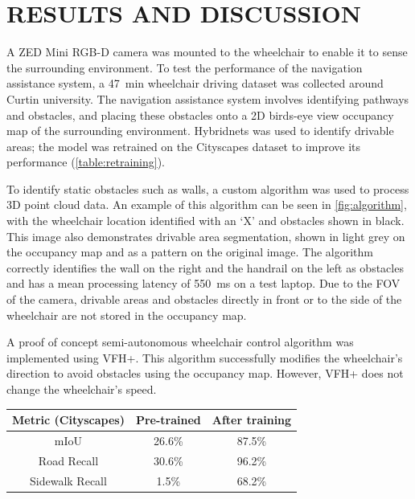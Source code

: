 \documentclass[10pt,twoside]{article}
\begin{document}
\section*{\textbf{RESULTS AND DISCUSSION}} %
A ZED Mini RGB-D camera was mounted to the wheelchair to enable it to
sense the surrounding environment. To test the performance of the navigation
assistance system, a \SI{47}{\minute} wheelchair driving dataset was collected around
Curtin university.
The navigation assistance system involves identifying pathways and obstacles,
and placing these obstacles onto a 2D birds-eye view occupancy map of the
surrounding environment. Hybridnets was used to identify drivable
areas; the model was retrained on the Cityscapes dataset to improve its performance (\cref{table:retraining}).

To identify static obstacles such as walls, a custom algorithm was used to process 3D point cloud data.
An example of this algorithm can be seen in \cref{fig:algorithm},
with the wheelchair location identified with an `X' and obstacles shown in black.
This image also demonstrates drivable area segmentation, shown in light grey on the
occupancy map and as a pattern on the original image.
The algorithm correctly identifies the wall on the right and the handrail on the left as obstacles
and has a mean processing latency of \SI{550}{\milli\second} on a test laptop.
Due to the FOV of the camera, drivable areas and obstacles directly in front or to the side of
the wheelchair are not stored in the occupancy map.

A proof of concept semi-autonomous wheelchair control algorithm was implemented using VFH+.
This algorithm successfully modifies the wheelchair's direction to avoid obstacles using the
occupancy map. However, VFH+ does not change the wheelchair's speed.

\setlength{\abovecaptionskip}{0pt}
\setlength{\belowcaptionskip}{10pt}
\begin{center}
    \label{table:retraining}
    \begin{tabular}{c c c}
    \toprule
    Metric (Cityscapes) & Pre-trained & After training \\
    \midrule
    mIoU & 26.6\% & 87.5\% \\
    Road Recall & 30.6\% & 96.2\% \\
    Sidewalk Recall & 1.5\% & 68.2\% \\
    \bottomrule
    \end{tabular}
\end{center}
\end{document}
